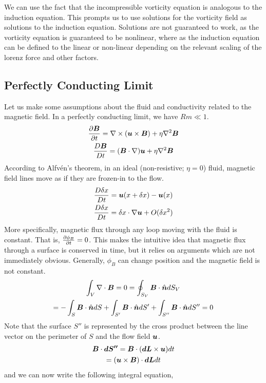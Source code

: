 \documentclass{article}
\begin{document}
We can use the fact that the incompressible vorticity equation is analogous to
the induction equation. This prompts us to use solutions for the vorticity field
as solutions to the induction equation. Solutions are not guaranteed to work, as
the vorticity equation is guaranteed to be nonlinear, where as the induction
equation can be defined to the linear or non-linear depending on the relevant
scaling of the lorenz force and other factors. 

\subsection{Perfectly Conducting Limit}

Let us make some assumptions about the fluid and conductivity related to the
magnetic field. In a perfectly conducting limit, we have $Rm \ll 1$. 
\begin{gather*}
    \frac{\partial \boldsymbol{B}}{\partial t} = \nabla\times(\boldsymbol{u}\times\boldsymbol{B}) + \eta\nabla^2\boldsymbol{B}\\
    \frac{D \boldsymbol{B}}{D t} = (\boldsymbol{B}\cdot\nabla)\boldsymbol{u} + \eta\nabla^2\boldsymbol{B}
\end{gather*}
According to Alfv\'en's theorem, in an ideal (non-resistive; $\eta = 0$) fluid,
magnetic field lines move as if they are frozen-in to the flow. 
\begin{gather*}
    \frac{D \delta x}{D t} = \boldsymbol{u}(x + \delta x) - \boldsymbol{u}(x) \\
    \frac{D \delta x}{D t} = \delta x \cdot \nabla \boldsymbol{u} + O(\delta x^2)
\end{gather*}
More specifically, magnetic flux through any loop moving with the fluid is constant.
That is, $\frac{\partial \phi_B}{\partial t} = 0$. This makes the intuitive idea that magnetic flux
through a surface is conserved in time, but it relies on arguments which are not
immediately obvious. Generally, $\phi_B$ can change position and the magnetic
field is not constant. 
\begin{gather*}
    \int_V \nabla \cdot{\boldsymbol{B}} = 0 = \oint_{S_V} \boldsymbol{B}\cdot\hat{\boldsymbol{n}}dS_V\\
    = -\int_S \boldsymbol{B}\cdot\hat{\boldsymbol{n}} dS + \int_{S'}\boldsymbol{B}\cdot\hat{\boldsymbol{n}} dS' + \int_{S''}
    \boldsymbol{B}\cdot\hat{\boldsymbol{n}} dS'' = 0
\end{gather*}
Note that the surface $S''$ is represented by the cross product between the line
vector on the perimeter of $S$ and the flow field $\boldsymbol{u}$. 
\begin{gather*}
    \boldsymbol{B} \cdot\boldsymbol{dS''} = \boldsymbol{B} \cdot (\boldsymbol{dL} \times \boldsymbol{u}) dt\\
    = (\boldsymbol{u}\times\boldsymbol{B}) \cdot \boldsymbol{dL}dt
\end{gather*}
and we can now write the following integral equation,
\end{document}
